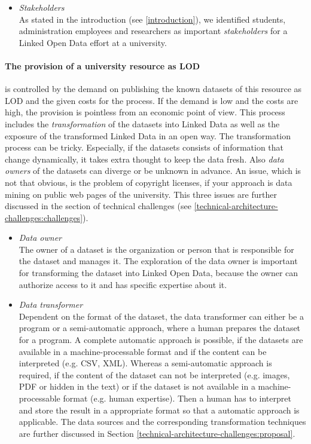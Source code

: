 \documentclass{article}
\begin{document}
\begin{itemize}
\item \textit{Stakeholders}~\\
As stated in the introduction (see \ref{introduction}), we identified students, administration employees and researchers as important \textit{stakeholders} for a Linked Open Data effort at a university.

\end{itemize}

\paragraph{The provision of a university resource as LOD}
\label{technical-architecture-challenges:lod-effort:provision-resources}
is controlled by the demand on publishing the known datasets of this resource as LOD and the given costs for the process. If the demand is low and the costs are high, the provision is pointless from an economic point of view. This process includes the \textit{transformation} of the datasets into Linked Data as well as the exposure of the transformed Linked Data in an open way. The transformation process can be tricky. Especially, if the datasets consists of information that change dynamically, it takes extra thought to keep the data fresh. Also \textit{data owners} of the datasets can diverge or be unknown in advance. An issue, which is not that obvious, is the problem of copyright licenses, if your approach is data mining on public web pages of the university. This three issues are further discussed in the section of technical challenges (see \ref{technical-architecture-challenges:challenges}).

\begin{itemize}
\item \textit{Data owner}~\\
The owner of a dataset is the organization or person that is responsible for the dataset and manages it. The exploration of the data owner is important for transforming the dataset into Linked Open Data, because the owner can authorize access to it and has specific expertise about it. 

\item \textit{Data transformer}~\\
Dependent on the format of the dataset, the data transformer can either be a program or a semi-automatic approach, where a human prepares the dataset for a program. A complete automatic approach is possible, if the datasets are available in a machine-processable format and if the content can be interpreted (e.g. CSV, XML). Whereas a semi-automatic approach is required, if the content of the dataset can not be interpreted (e.g. images, PDF or hidden in the text) or if the dataset is not available in a machine-processable format (e.g. human expertise). Then a human has to interpret and store the result in a appropriate format so that a automatic approach is applicable. The data sources and the corresponding transformation techniques are further discussed in Section \ref{technical-architecture-challenges:proposal}.

\end{itemize}
\end{document}
